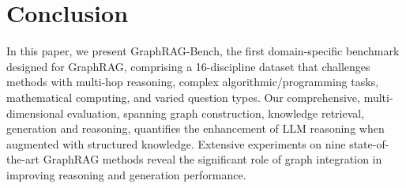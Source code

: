 \documentclass{article}
\begin{document}
\section{Conclusion}
In this paper, we present GraphRAG-Bench, the first domain-specific benchmark designed for GraphRAG, comprising a 16-discipline dataset that challenges methods with multi-hop reasoning, complex algorithmic/programming tasks, mathematical computing, and varied question types. Our comprehensive, multi-dimensional evaluation, spanning graph construction, knowledge retrieval, generation and reasoning, quantifies the enhancement of LLM reasoning when augmented with structured knowledge. Extensive experiments on nine state-of-the-art GraphRAG methods reveal the significant role of graph integration in improving reasoning and generation performance.

\medskip

\newpage
{
\small

}



\end{document}
